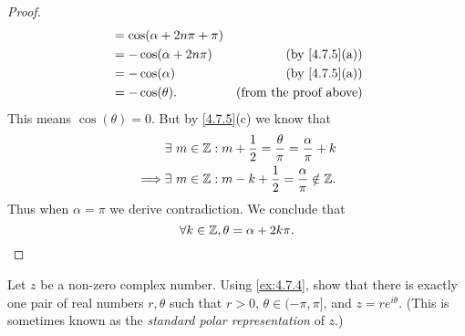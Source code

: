 \begin{proof}
\begin{align*}
                 & = \cos(\alpha + 2 n \pi + \pi)                                        \\
                 & = -\cos(\alpha + 2 n \pi)             & \text{(by \cref{4.7.5}(a))}   \\
                 & = -\cos(\alpha)                       & \text{(by \cref{4.7.5}(a))}   \\
                 & = -\cos(\theta).                      & \text{(from the proof above)}
  \end{align*}
  This means \(\cos(\theta) = 0\).
  But by \cref{4.7.5}(c) we know that
  \begin{align*}
             & \exists\ m \in \mathbb{Z} : m + \frac{1}{2} = \frac{\theta}{\pi} = \frac{\alpha}{\pi} + k \\
    \implies & \exists\ m \in \mathbb{Z} : m - k + \frac{1}{2} = \frac{\alpha}{\pi} \notin \mathbb{Z}.
  \end{align*}
  Thus when \(\alpha = \pi\) we derive contradiction.
  We conclude that
  \[
    \forall k \in \mathbb{Z}, \theta = \alpha + 2 k \pi.
  \]
\end{proof}

\begin{ex}\label{ex:4.7.6}
  Let \(z\) be a non-zero complex number.
  Using \cref{ex:4.7.4}, show that there is exactly one pair of real numbers \(r, \theta\) such that \(r > 0\), \(\theta \in (-\pi, \pi]\), and \(z = r e^{i \theta}\).
  (This is sometimes known as the \emph{standard polar representation} of \(z\).)
\end{ex}

